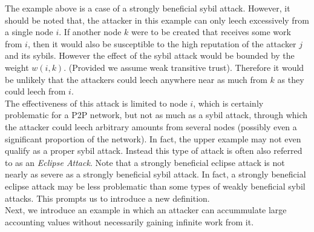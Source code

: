 \documentclass[11pt,a4paper]{report}
\theoremstyle{definition}
\theoremstyle{theorem}
\theoremstyle{proposition}
\theoremstyle{corollary}
\theoremstyle{lemma}
\theoremstyle{example}
\theoremstyle{remark}
\begin{document}
\noindent{}The example above is a case of a strongly beneficial sybil attack. However, it should be noted that, the attacker in this example can only leech excessively from a single node $i$. If another node $k$ were to be created that receives some work from $i$, then it would also be susceptible to the high reputation of the attacker $j$ and its sybils. However the effect of the sybil attack would be bounded by the weight $w(i,k)$. (Provided we assume weak transitive trust). Therefore it would be unlikely that the attackers could leech anywhere near as much from $k$ as they could leech from $i$. \vspace{1em}\\

\noindent{}The effectiveness of this attack is limited to node $i$, which is certainly problematic for a P2P network, but not as much as a sybil attack, through which the attacker could leech arbitrary amounts from several nodes (possibly even a significant proportion of the network). In fact, the upper example may not even qualify as a proper sybil attack. Instead this type of attack is often also referred to as an {\it Eclipse Attack}. Note that a strongly beneficial eclipse attack is not nearly as severe as a strongly beneficial sybil attack. In fact, a strongly beneficial eclipse attack may be less problematic than some types of weakly beneficial sybil attacks. This prompts us to introduce a new definition.\vspace{1em}\\

\noindent{}Next, we introduce an example in which an attacker can accummulate large accounting values without necessarily gaining infinite work from it.
\end{document}
